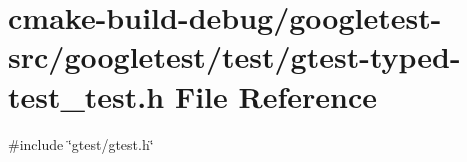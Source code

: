 \hypertarget{gtest-typed-test__test_8h}{}\section{cmake-\/build-\/debug/googletest-\/src/googletest/test/gtest-\/typed-\/test\+\_\+test.h File Reference}
\label{gtest-typed-test__test_8h}
{\ttfamily \#include \char`\"{}gtest/gtest.\+h\char`\"{}}\newline
